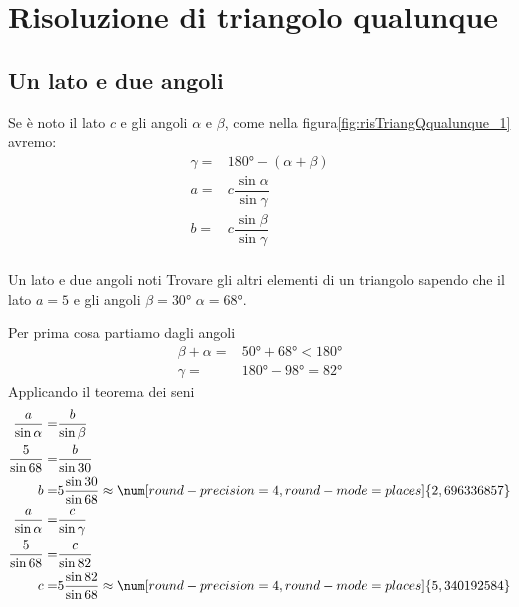 \section{Risoluzione di triangolo qualunque}
\subsection{Un lato e due angoli}
Se è noto il lato $c$ e gli angoli $\alpha$ e $\beta$, come nella figura\nobs\vref{fig:risTriangQqualunque_1} avremo:
\begin{align*}
\gamma=&\ang{180}-(\alpha+\beta)\\
a=&c\dfrac{\sin\alpha}{\sin\gamma}\\
b=&c\dfrac{\sin\beta}{\sin\gamma}\\
\end{align*}
\begin{esempiot}{Un lato e due angoli noti}{}
	Trovare gli altri elementi di un triangolo sapendo che il lato $a=5$ e  gli angoli $\beta=\ang{30}$ $\alpha=\ang{68}$.
\end{esempiot}
Per prima cosa partiamo dagli angoli
\begin{align*}
\beta+\alpha=&\ang{50}+\ang{68}<\ang{180}\\
\gamma=&\ang{180}-\ang{98}=\ang{82}
\end{align*}
Applicando il teorema dei seni
\begin{align*}
\dfrac{a}{\sin\alpha}=&\dfrac{b}{\sin\beta}\\
\dfrac{5}{\sin 68}=&\dfrac{b}{\sin 30}\\
b=&5\dfrac{\sin 30}{\sin 68}\approx\num[round-precision=\lungarrotandamento,round-mode=places]{2,696336857}\\
\dfrac{a}{\sin\alpha}=&\dfrac{c}{\sin\gamma}\\
\dfrac{5}{\sin 68}=&\dfrac{c}{\sin 82}\\
c=&5\dfrac{\sin 82}{\sin 68}\approx\num[round-precision=\lungarrotandamento,round-mode=places]{5,340192584}\\
\end{align*}

